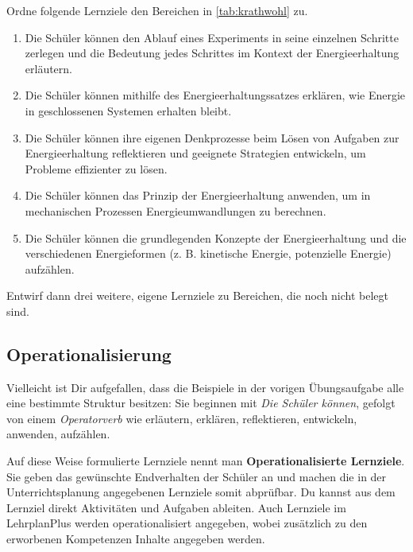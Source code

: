 \begin{uea}
	Ordne folgende Lernziele den Bereichen in \cref{tab:krathwohl} zu.
	\begin{enumerate}[label=\alph*.]
		\item Die Schüler können den Ablauf eines Experiments in seine einzelnen Schritte zerlegen und die Bedeutung jedes Schrittes im Kontext der Energieerhaltung erläutern.
		\item Die Schüler können mithilfe des Energieerhaltungssatzes erklären, wie Energie in geschlossenen Systemen erhalten bleibt.
		\item Die Schüler können ihre eigenen Denkprozesse beim Lösen von Aufgaben zur Energieerhaltung reflektieren und geeignete Strategien entwickeln, um Probleme effizienter zu lösen.
		\item Die Schüler können das Prinzip der Energieerhaltung anwenden, um in mechanischen Prozessen Energieumwandlungen zu berechnen.
		\item Die Schüler können die grundlegenden Konzepte der Energieerhaltung und die verschiedenen Energieformen (z. B. kinetische Energie, potenzielle Energie) aufzählen.
	\end{enumerate}
	Entwirf dann drei weitere, eigene Lernziele zu Bereichen, die noch nicht belegt sind.
	
	\flushright{}
\end{uea}

\subsection{Operationalisierung}
Vielleicht ist Dir aufgefallen, dass die Beispiele in der vorigen Übungsaufgabe alle eine bestimmte Struktur besitzen: Sie beginnen mit \emph{Die Schüler können}, gefolgt von einem \emph{Operatorverb} wie erläutern, erklären, reflektieren, entwickeln, anwenden, aufzählen.

\mip
Auf diese Weise formulierte Lernziele nennt man \textbf{Operationalisierte Lernziele}. Sie geben das gewünschte Endverhalten der Schüler an und machen die in der Unterrichtsplanung angegebenen Lernziele somit abprüfbar. Du kannst aus dem Lernziel direkt Aktivitäten und Aufgaben ableiten. Auch Lernziele im LehrplanPlus werden operationalisiert angegeben, wobei zusätzlich zu den erworbenen Kompetenzen Inhalte angegeben werden.

